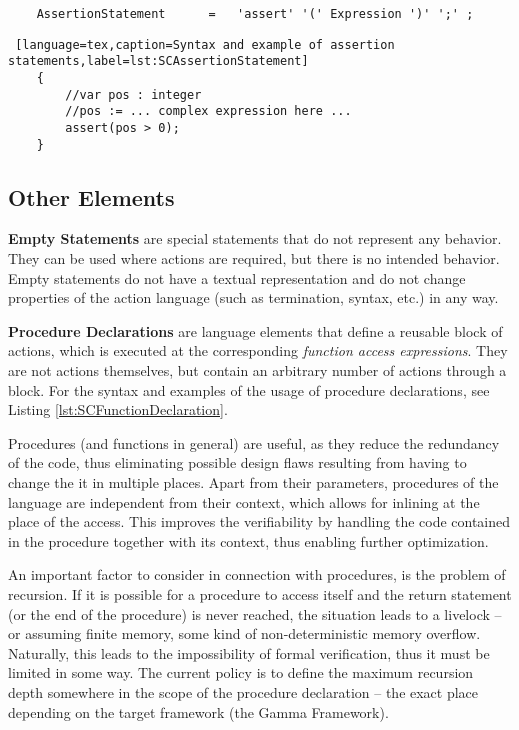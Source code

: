 \bigskip
\begin{lstlisting}
	AssertionStatement		= 	'assert' '(' Expression ')' ';' ;
\end{lstlisting}
\begin{lstlisting} [language=tex,caption=Syntax and example of assertion statements,label=lst:SCAssertionStatement]
	{
		//var pos : integer
		//pos := ... complex expression here ...
		assert(pos > 0);
	}
\end{lstlisting} 

\subsection{Other Elements}

\textbf{Empty Statements} are special statements that do not represent any behavior. They can be used where actions are required, but there is no intended behavior. Empty statements do not have a textual representation and do not change properties of the action language (such as termination, syntax, etc.) in any way.

\bigskip
\textbf{Procedure Declarations} are language elements that define a reusable block of actions, which is executed at the corresponding \textit{function access expressions}. They are not actions themselves, but contain an arbitrary number of actions through a block. For the syntax and examples of the usage of procedure declarations, see Listing \ref{lst:SCFunctionDeclaration}.

Procedures (and functions in general) are useful, as they reduce the redundancy of the code, thus eliminating possible design flaws resulting from having to change the it in multiple places. Apart from their parameters, procedures of the language are independent from their context, which allows for inlining at the place of the access. This improves the verifiability by handling the code contained in the procedure together with its context, thus enabling further optimization.

An important factor to consider in connection with procedures, is the problem of recursion. If it is possible for a procedure to access itself and the return statement (or the end of the procedure) is never reached, the situation leads to a livelock -- or assuming finite memory, some kind of non-deterministic memory overflow. Naturally, this leads to the impossibility of formal verification, thus it must be limited in some way. The current policy is to define the maximum recursion depth somewhere in the scope of the procedure declaration -- the exact place depending on the target framework (the Gamma Framework).

